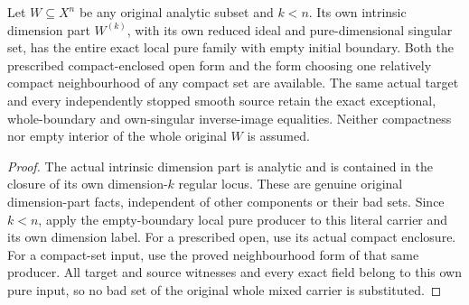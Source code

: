 \begin{corollary}
\label{hir:original-local-own-dimension-part-empty-exact-family}
\leanok
Let $W\subseteq X^n$ be any original analytic subset and $k<n$.
Its own intrinsic dimension part $W^{(k)}$, with its own reduced ideal
and pure-dimensional singular set, has the entire exact local pure
family with empty initial boundary. Both the prescribed compact-enclosed
open form and the form choosing one relatively compact neighbourhood of
any compact set are available. The same actual target and every
independently stopped smooth source retain the exact exceptional,
whole-boundary and own-singular inverse-image equalities. Neither
compactness nor empty interior of the whole original $W$ is assumed.
\end{corollary}
\begin{proof}
The actual intrinsic dimension part is analytic and is contained in the
closure of its own dimension-$k$ regular locus. These are genuine
original dimension-part facts, independent of other components or their
bad sets. Since $k<n$, apply the empty-boundary local pure producer to
this literal carrier and its own dimension label. For a prescribed open,
use its actual compact enclosure. For a compact-set input, use the
proved neighbourhood form of that same producer. All target and source
witnesses and every exact field belong to this own pure input, so no bad
set of the original whole mixed carrier is substituted.
\end{proof}
